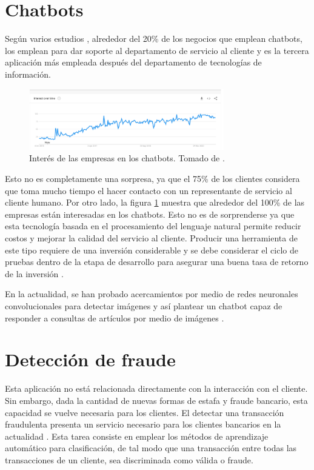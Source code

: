 \documentclass[conference]{IEEEtran}
\begin{document}
\section{Chatbots}

Según varios estudios \cite{chatbotsresearch}, alrededor del 20\% de los negocios que emplean chatbots, los emplean para dar soporte al departamento de servicio al cliente y es la tercera aplicación más empleada después del departamento de tecnologías de información.

\begin{figure}
\centering
\includegraphics[width=8.5cm]{IEEEtran/images/chatbot_interest.png}
\caption{Interés de las empresas en los chatbots. Tomado de \cite{chatbotsresearch}.}
\label{fig:chatbot_interest}
\end{figure}

Esto no es completamente una sorpresa, ya que el 75\% de los clientes considera que toma mucho tiempo el hacer contacto con un representante de servicio al cliente humano. Por otro lado, la figura \ref{fig:chatbot_interest} muestra que alrededor del 100\% de las empresas están interesadas en los chatbots. Esto no es de sorprenderse ya que esta tecnología basada en el procesamiento del lenguaje natural \cite{ubercota, 9325440} permite reducir costos y mejorar la calidad del servicio al cliente. Producir una herramienta de este tipo requiere de una inversión considerable \cite{9322667} y se debe considerar el ciclo de pruebas dentro de la etapa de desarrollo para asegurar una buena tasa de retorno de la inversión \cite{chatbottesting, chatbottestingframework}.

En la actualidad, se han probado acercamientos por medio de redes neuronales convolucionales para detectar imágenes y así plantear un chatbot capaz de responder a consultas de artículos por medio de imágenes \cite{9335874}.

\section{Detección de fraude}

Esta aplicación no está relacionada directamente con la interacción con el cliente. Sin embargo, dada la cantidad de nuevas formas de estafa y fraude bancario, esta capacidad se vuelve necesaria para los clientes. El detectar una transacción fraudulenta presenta un servicio necesario para los clientes bancarios en la actualidad \cite{9182954, 9342475}. Esta tarea consiste en emplear los métodos de aprendizaje automático para clasificación, de tal modo que una transacción entre todas las transacciones de un cliente, sea discriminada como válida o fraude.
\end{document}
